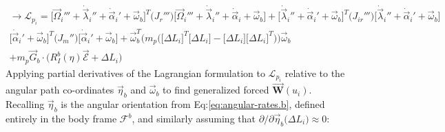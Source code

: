 \begin{multline}
\rightarrow\mathcal{L}_{p_i}=\Big[\vec{\Omega}_i'''+\dot{\vec{\lambda}}_i''+\dot{\vec{\alpha}}_i'+\vec{\omega}_b\Big]^T\big(J_r'''\big)\Big[\vec{\Omega}_i'''+\dot{\vec{\lambda}}_i''+\dot{\vec{\alpha}}_i+\vec{\omega}_b\Big]+\Big[\dot{\vec{\lambda}}_i''+\dot{\vec{\alpha}}_i'+\vec{\omega}_b\Big]^T\big(J_{ir}'''\big)\Big[\dot{\vec{\lambda}}_i''+\dot{\vec{\alpha}}_i'+\vec{\omega}_b\Big]
\\
\Big[\dot{\vec{\alpha}}_i'+\vec{\omega}_b\Big]^T\big(J_m''\big)\Big[\dot{\vec{\alpha}}_i'+\vec{\omega}_b\Big]+\vec{\omega}_{b}^T\big(m_p\Big(\big[\Delta L_i\big]^T\big[\Delta L_i\big]-\big[\Delta L_i\big]\big[\Delta L_i\big]^T\Big)\big)\vec{\omega}_{b}
\\
+m_p\vec{G}_b\cdot\big(R_I^b(\eta)\vec{\mathcal{E}}+\Delta L_i\big)
\end{multline}
Applying partial derivatives of the Lagrangian formulation to $\mathcal{L}_{p_i}$ relative to the angular path co-ordinates $\vec{\eta}_b$ and $\vec{\omega}_b$ to find generalized forced $\vec{\mathbf{W}}(u_i)$. Recalling $\vec{\eta}_b$ is the angular orientation from Eq:\ref{eq:angular-rates.b}, defined entirely in the body frame $\mathcal{F}^b$, and similarly assuming that $\partial/\partial\vec{\eta}_b\big(\Delta L_i\big)\approx 0$:
